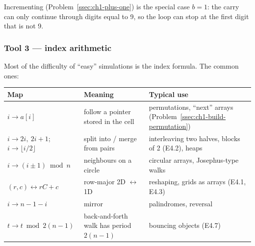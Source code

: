 Incrementing (Problem~\ref{ssec:ch1-plus-one}) is the special case $b = 1$: the carry can only continue through digits equal to 9, so the loop can stop at the first digit that is not 9.

\subsubsection*{Tool 3 --- index arithmetic}

Most of the difficulty of ``easy'' simulations is the index formula. The common ones:

\begin{table}[H]
\centering\small
\renewcommand{\arraystretch}{1.2}
\begin{tabularx}{\linewidth}{@{}>{\raggedright\arraybackslash}p{3.3cm} >{\raggedright\arraybackslash}p{4.3cm} X@{}}
\toprule
\textbf{Map} & \textbf{Meaning} & \textbf{Typical use} \\
\midrule
$i \to a[i]$ & follow a pointer stored in the cell & permutations, ``next'' arrays (Problem~\ref{ssec:ch1-build-permutation}) \\
$i \to 2i,\ 2i+1$; \ $i \to \lfloor i/2 \rfloor$ & split into / merge from pairs & interleaving two halves, blocks of 2 (E4.2), heaps \\
$i \to (i \pm 1) \bmod n$ & neighbours on a circle & circular arrays, Josephus-type walks \\
$(r, c) \leftrightarrow rC + c$ & row-major 2D $\leftrightarrow$ 1D & reshaping, grids as arrays (E4.1, E4.3) \\
$i \to n-1-i$ & mirror & palindromes, reversal \\
$t \to t \bmod 2(n-1)$ & back-and-forth walk has period $2(n-1)$ & bouncing objects (E4.7) \\
\bottomrule
\end{tabularx}
\end{table}

